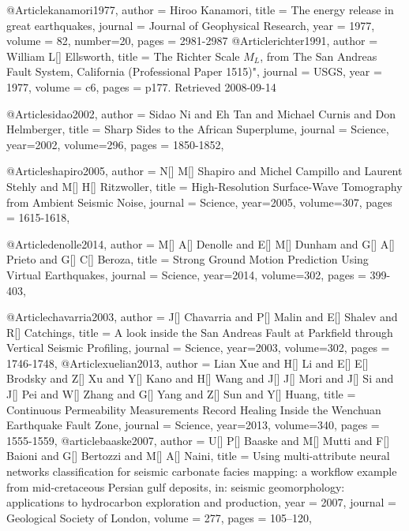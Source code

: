@Article{kanamori1977,
  author = 	 {Hiroo Kanamori},
  title = 	 {The energy release in great earthquakes},
  journal = 	 {Journal of Geophysical Research},
  year = 	 1977,
  volume = 82,
  number=20,
  pages =	 {2981-2987}
}
@Article{richter1991,
  author = 	 {William L[] Ellsworth},
  title = 	 {The Richter Scale $M_L$, from The San Andreas Fault System, California (Professional Paper 1515)"},
  journal = 	 {USGS},
  year = 	 1977,
  volume = c6,
  pages =	 {p177. Retrieved 2008-09-14}
}



@Article{sidao2002,
  author =	 {Sidao Ni and Eh Tan and Michael Curnis and Don Helmberger},
  title =	 {Sharp Sides to the African Superplume},
  journal =	 {Science},
  year=2002,
  volume=296,
  pages =	 {1850-1852},
}

@Article{shapiro2005,
  author =	 {N[] M[] Shapiro and Michel Campillo and Laurent Stehly and M[] H[] Ritzwoller},
  title =	 {High-Resolution Surface-Wave Tomography from Ambient Seismic Noise},
  journal =	 {Science},
  year=2005,
  volume=307,
  pages =	 {1615-1618},
}

@Article{denolle2014,
  author =	 {M[] A[] Denolle and E[] M[] Dunham and G[] A[] Prieto and G[] C[] Beroza},
  title =	 {Strong Ground Motion Prediction Using Virtual Earthquakes},
  journal =	 {Science},
  year=2014,
  volume=302,
  pages =	 {399-403},
}

@Article{chavarria2003,
  author =	 {J[] Chavarria and P[] Malin and E[] Shalev and R[] Catchings},
  title =	 {A look inside the San Andreas Fault at Parkfield through Vertical Seismic Profiling},
  journal =	 {Science},
  year=2003,
  volume=302,
  pages =	 {1746-1748},
}
@Article{xuelian2013,
  author =	 {Lian Xue and H[] Li and E[] E[] Brodsky and Z[] Xu and Y[] Kano and H[] Wang and J[] J[] Mori and J[] Si and J[] Pei and W[] Zhang and G[] Yang and Z[] Sun and Y[] Huang},
  title =	 {Continuous Permeability Measurements Record Healing Inside the Wenchuan Earthquake Fault Zone},
  journal =	 {Science},
  year=2013,
  volume=340,
  pages =	 {1555-1559},
}
@article{baaske2007,
author = {U[] P[] Baaske and M[] Mutti and F[] Baioni and G[] Bertozzi and M[] A[] Naini},
title = {Using multi-attribute neural networks classification for seismic carbonate facies mapping: a workflow example from mid-cretaceous Persian gulf deposits, in: seismic geomorphology: applications to hydrocarbon exploration and production},
year = {2007},
journal = {Geological Society of London},
volume = {277},
pages = {105–120},
}



